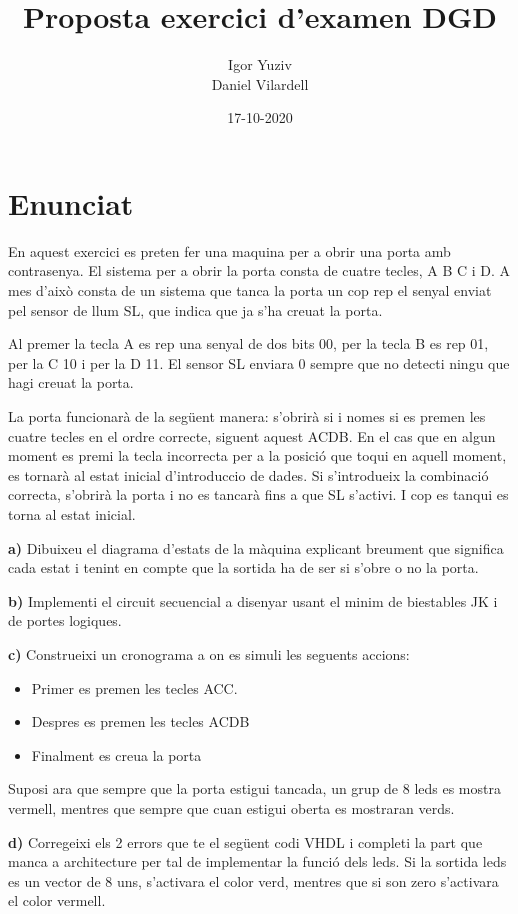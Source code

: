 \documentclass[12pt, a4papre]{article}
\author{Igor Yuziv\\
	Daniel Vilardell}
\title{Proposta exercici d'examen DGD}
\date{17-10-2020}
\begin{document}
	\maketitle
	\begin{center}
	\end{center}
	\section{Enunciat} 
	En aquest exercici es preten fer una maquina per a obrir una porta amb contrasenya. El sistema per a obrir la porta consta de cuatre tecles, A B C i D. A mes d'això consta de un sistema que tanca la porta un cop rep el senyal enviat pel sensor de llum SL, que indica que ja s'ha creuat la porta. 
	
	Al premer la tecla A es rep una senyal de dos bits 00, per la tecla B es rep 01, per la C 10 i per la D 11. El sensor SL enviara 0 sempre que no detecti ningu que hagi creuat la porta.
	
	La porta funcionarà de la següent manera: s'obrirà si i nomes si es premen les cuatre tecles en el ordre correcte, siguent aquest ACDB. En el cas que en algun moment es premi la tecla incorrecta per a la posició que toqui en aquell moment, es tornarà al estat inicial d'introduccio de dades. Si s'introdueix la combinació correcta, s'obrirà la porta i no es tancarà fins a que SL s'activi. I cop es tanqui es torna al estat inicial.
	
	\textbf{a)} Dibuixeu el diagrama d’estats de la màquina explicant breument que significa cada estat i tenint en compte que la sortida ha de ser si s'obre o no la porta.
	
	\textbf{b)} Implementi el circuit secuencial a disenyar usant el minim de biestables JK i de portes logiques.
	
	\textbf{c)} Construeixi un cronograma a on es simuli les seguents accions:
	
	\begin{itemize}
		\item Primer es premen les tecles ACC.
		\item Despres es premen les tecles ACDB
		\item Finalment es creua la porta
	\end{itemize}
	
	Suposi ara que sempre que la porta estigui tancada, un grup de 8 leds es mostra vermell, mentres que sempre que cuan estigui oberta es mostraran verds.
	
	\textbf{d)} Corregeixi els 2 errors que te el següent codi VHDL i completi la part que manca a architecture per tal de implementar la funció dels leds. Si la sortida leds es un vector de 8 uns, s'activara el color verd, mentres que si son zero s'activara el color vermell.
	
\end{document}
